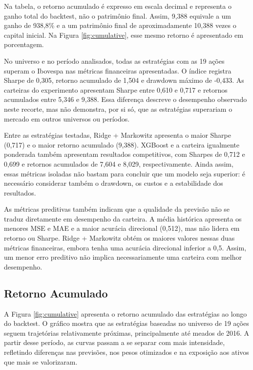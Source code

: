 \documentclass[12pt,a4paper]{article}
\begin{document}
Na tabela, o retorno acumulado é expresso em escala decimal e representa o ganho total do backtest, não o patrimônio final. Assim, 9,388 equivale a um ganho de 938,8\% e a um patrimônio final de aproximadamente 10,388 vezes o capital inicial. Na Figura \ref{fig:cumulative}, esse mesmo retorno é apresentado em porcentagem.

No universo e no período analisados, todas as estratégias com as 19 ações superam o Ibovespa nas métricas financeiras apresentadas. O índice registra Sharpe de 0,305, retorno acumulado de 1,504 e drawdown máximo de -0,433. As carteiras do experimento apresentam Sharpe entre 0,610 e 0,717 e retornos acumulados entre 5,346 e 9,388. Essa diferença descreve o desempenho observado neste recorte, mas não demonstra, por si só, que as estratégias superariam o mercado em outros universos ou períodos.

Entre as estratégias testadas, Ridge + Markowitz apresenta o maior Sharpe (0,717) e o maior retorno acumulado (9,388). XGBoost e a carteira igualmente ponderada também apresentam resultados competitivos, com Sharpes de 0,712 e 0,699 e retornos acumulados de 7,604 e 8,029, respectivamente. Ainda assim, essas métricas isoladas não bastam para concluir que um modelo seja superior: é necessário considerar também o drawdown, os custos e a estabilidade dos resultados.

As métricas preditivas também indicam que a qualidade da previsão não se traduz diretamente em desempenho da carteira. A média histórica apresenta os menores MSE e MAE e a maior acurácia direcional (0,512), mas não lidera em retorno ou Sharpe. Ridge + Markowitz obtém os maiores valores nessas duas métricas financeiras, embora tenha uma acurácia direcional inferior a 0,5. Assim, um menor erro preditivo não implica necessariamente uma carteira com melhor desempenho.

\subsection{Retorno Acumulado}

A Figura \ref{fig:cumulative} apresenta o retorno acumulado das estratégias ao longo do backtest. O gráfico mostra que as estratégias baseadas no universo de 19 ações seguem trajetórias relativamente próximas, principalmente até meados de 2016. A partir desse período, as curvas passam a se separar com mais intensidade, refletindo diferenças nas previsões, nos pesos otimizados e na exposição aos ativos que mais se valorizaram.
\end{document}
